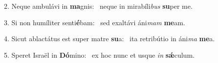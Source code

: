 2. Neque ambulávi in \textbf{ma}gnis: \ast\  neque in mirabíli\textit{bus} \textbf{su}per me.\

3. Si non humíliter senti\textbf{é}bam: \ast\  sed exaltávi áni\textit{mam} \textbf{me}am.\

4. Sicut ablactátus est super matre \textbf{su}a: \ast\  ita retribútio in áni\textit{ma} \textbf{me}a.\

5. Speret Israël in \textbf{Dó}mino: \ast\  ex hoc nunc et usque \textit{in} \textbf{sǽ}culum.\

